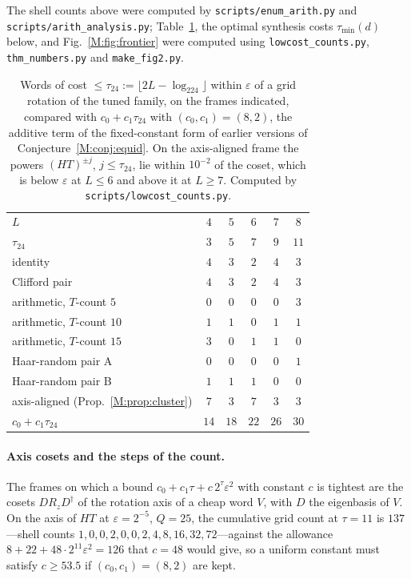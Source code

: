 \documentclass[aps,prx,twocolumn,superscriptaddress,nofootinbib,longbibliography]{revtex4-2}
\theoremstyle{plain}
\theoremstyle{definition}
\theoremstyle{remark}
\begin{document}
The shell counts above were computed by \texttt{scripts/\allowbreak enum\_arith.py} and \texttt{scripts/\allowbreak arith\_analysis.py}; Table~\ref{tab:lowcost}, the optimal synthesis costs $\tau_{\min}(d)$ below, and Fig.~\ref{M:fig:frontier} were computed using \texttt{lowcost\_counts.py}, \texttt{thm\_numbers.py} and \texttt{make\_fig2.py}.
\begin{table}[t]
\centering\footnotesize
\caption{Words of cost $\le\tau_{24}:=\lfloor2L-\log_224\rfloor$ within $\varepsilon$ of a grid rotation of the tuned family, on the frames indicated, compared with $c_0+c_1\tau_{24}$ with $(c_0,c_1)=(8,2)$, the additive term of the fixed-constant form of earlier versions of Conjecture~\ref{M:conj:equid}. On the axis-aligned frame the powers $(HT)^{\pm j}$, $j\le\tau_{24}$, lie within $10^{-2}$ of the coset, which is below $\varepsilon$ at $L\le6$ and above it at $L\ge7$. Computed by \texttt{scripts/lowcost\_counts.py}.}
\label{tab:lowcost}
\setlength{\tabcolsep}{4pt}\begin{tabular}{@{}l ccccc@{}}
\toprule
$L$ & $4$ & $5$ & $6$ & $7$ & $8$\\
$\tau_{24}$ & $3$ & $5$ & $7$ & $9$ & $11$\\
\midrule
identity & $4$ & $3$ & $2$ & $4$ & $3$\\
Clifford pair & $4$ & $3$ & $2$ & $4$ & $3$\\
arithmetic, $T$-count $5$ & $0$ & $0$ & $0$ & $0$ & $3$\\
arithmetic, $T$-count $10$ & $1$ & $1$ & $0$ & $1$ & $1$\\
arithmetic, $T$-count $15$ & $3$ & $0$ & $1$ & $1$ & $0$\\
Haar-random pair A & $0$ & $0$ & $0$ & $0$ & $1$\\
Haar-random pair B & $1$ & $1$ & $1$ & $0$ & $0$\\
axis-aligned (Prop.~\ref{M:prop:cluster}) & $7$ & $3$ & $7$ & $3$ & $3$\\
\midrule
$c_0+c_1\tau_{24}$ & $14$ & $18$ & $22$ & $26$ & $30$\\
\bottomrule
\end{tabular}
\end{table}

\paragraph{Axis cosets and the steps of the count.} The frames on which a bound $c_0+c_1\tau+c\,2^\tau\varepsilon^2$ with constant $c$ is tightest are the cosets $DR_zD^\dagger$ of the rotation axis of a cheap word $V$, with $D$ the eigenbasis of $V$. On the axis of $HT$ at $\varepsilon=2^{-5}$, $Q=25$, the cumulative grid count at $\tau=11$ is $137$---shell counts $1,0,0,2,0,0,2,4,8,16,32,72$---against the allowance $8+22+48\cdot2^{11}\varepsilon^2=126$ that $c=48$ would give, so a uniform constant must satisfy $c\ge53.5$ if $(c_0,c_1)=(8,2)$ are kept. 
\end{document}

